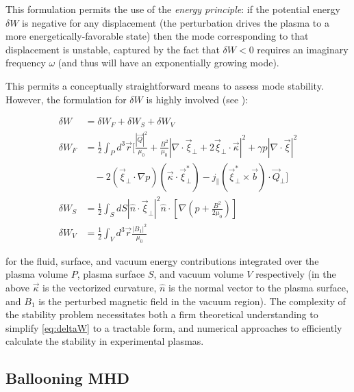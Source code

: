 \noindent This formulation permits the use of the \emph{energy principle}: if the potential energy $\delta W$ is negative for any displacement (\ie the perturbation drives the plasma to a more energetically-favorable state) then the mode corresponding to that displacement is unstable, captured by the fact that $\delta W < 0$ requires an imaginary frequency $\omega$ (and thus will have an exponentially growing mode).  

This permits a conceptually straightforward means to assess mode stability.  However, the formulation for $\delta W$ is highly involved (see \cite[\S 8.8]{Freidberg1987}):

\begin{equation}\label{eq:deltaW}
 \begin{aligned}
  \delta W &= \delta W_F + \delta W_S + \delta W_V\\
  \delta W_F &= \frac{1}{2} \int_P d^3 \vec{r} \Bigg[ \frac{|\vec{Q}|^2}{\mu_0} + \frac{B^2}{\mu_0} \left| \nabla \cdot \vec{\xi}_\perp + 2 \vec{\xi}_\perp \cdot \vec{\kappa} \right|^2 + \gamma p \left| \nabla \cdot \vec{\xi} \right|^2\\
  &\quad- 2\left( \vec{\xi}_\perp \cdot \nabla p \right) \left(\vec{\kappa} \cdot \vec{\xi}_\perp^* \right) - j_\parallel \left(\vec{\xi}_\perp^* \times \vec{b} \right) \cdot \vec{Q}_\perp \Bigg]\\
  \delta W_S &= \frac{1}{2} \int_S dS \left| \hat{n} \cdot \vec{\xi}_\perp \right|^2 \hat{n} \cdot \left[ \nabla \left( p + \frac{B^2}{2\mu_0} \right) \right]\\
  \delta W_V &= \frac{1}{2} \int_V d^3 \vec{r} \frac{\left|B_1 \right|^2}{\mu_0}
 \end{aligned}
\end{equation}

\noindent for the fluid, surface, and vacuum energy contributions integrated over the plasma volume $P$, plasma surface $S$, and vacuum volume $V$ respectively (in the above $\vec{\kappa}$ is the vectorized curvature, $\hat{n}$ is the normal vector to the plasma surface, and $B_1$ is the perturbed magnetic field in the vacuum region).  The complexity of the stability problem necessitates both a firm theoretical understanding to simplify \cref{eq:deltaW} to a tractable form, and numerical approaches to efficiently calculate the stability in experimental plasmas.

\subsection{Ballooning MHD}\label{subsec:mod_balloon}

